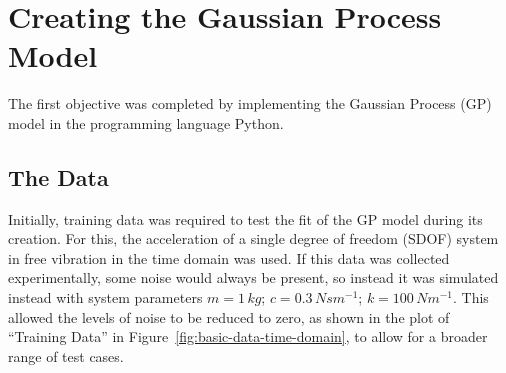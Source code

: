 \documentclass[12pt]{article}
\begin{document}
    \section{Creating the Gaussian Process Model}
    The first objective was completed by implementing the Gaussian Process (GP) model in the programming language Python.
    \subsection{The Data}
    Initially, training data was required to test the fit of the GP model during its creation.
    For this, the acceleration of a single degree of freedom (SDOF) system in free vibration in the time domain was used.
    If this data was collected experimentally, some noise would always be present, so instead it was simulated instead with system parameters $m = 1 \, kg$; $c = 0.3 \, Nsm^{-1}$; $k = 100 \, Nm^{-1}$.
    This allowed the levels of noise to be reduced to zero, as shown in the plot of ``Training Data'' in Figure~\ref{fig:basic-data-time-domain}, to allow for a broader range of test cases.




%


\end{document}
